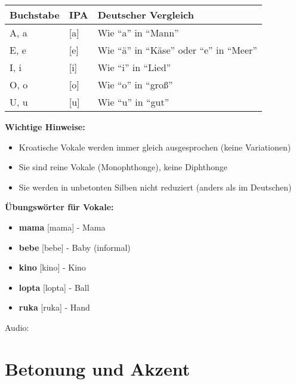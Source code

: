 \begin{tcolorbox}[colback=lightgreen!30, colframe=green!60!black, title=\textbf{Kroatische Vokale}]

\begin{center}
\begin{tabular}{lll}
\toprule
\textbf{Buchstabe} & \textbf{IPA} & \textbf{Deutscher Vergleich} \\
\midrule
A, a & [a] & Wie ``a'' in ``Mann'' \\
E, e & [e] & Wie ``ä'' in ``Käse'' oder ``e'' in ``Meer'' \\
I, i & [i] & Wie ``i'' in ``Lied'' \\
O, o & [o] & Wie ``o'' in ``groß'' \\
U, u & [u] & Wie ``u'' in ``gut'' \\
\bottomrule
\end{tabular}
\end{center}

\textbf{Wichtige Hinweise:}
\begin{itemize}
    \item Kroatische Vokale werden immer gleich ausgesprochen (keine Variationen)
    \item Sie sind reine Vokale (Monophthonge), keine Diphthonge
    \item Sie werden in unbetonten Silben nicht reduziert (anders als im Deutschen)
\end{itemize}

\textbf{Übungswörter für Vokale:}
\begin{itemize}
    \item \textbf{mama} [mama] - Mama
    \item \textbf{bebe} [bebe] - Baby (informal)
    \item \textbf{kino} [kino] - Kino
    \item \textbf{lopta} [lopta] - Ball
    \item \textbf{ruka} [ruka] - Hand
\end{itemize}

Audio: 

\end{tcolorbox}

\section{Betonung und Akzent}

